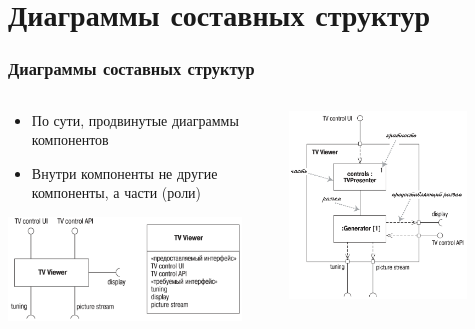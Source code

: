 \documentclass{../../slides-style}
\begin{document}
    \section{Диаграммы составных структур}

    \begin{frame}
        \frametitle{Диаграммы составных структур}
        \begin{columns}
            \begin{column}{0.5\textwidth}
                \begin{itemize}
                    \item По сути, продвинутые диаграммы компонентов
                    \item Внутри компоненты не другие компоненты, а части (роли)
                \end{itemize}
                \vspace{3mm}
                \begin{center}
                    \includegraphics[width=0.9\textwidth]{compositeStructureElement.png}
                \end{center}
            \end{column}
            \begin{column}{0.5\textwidth}
                \begin{center}
                    \includegraphics[width=0.8\textwidth]{compositeStructureDiagram.png}
                \end{center}
            \end{column}
        \end{columns}
    \end{frame}
\end{document}

